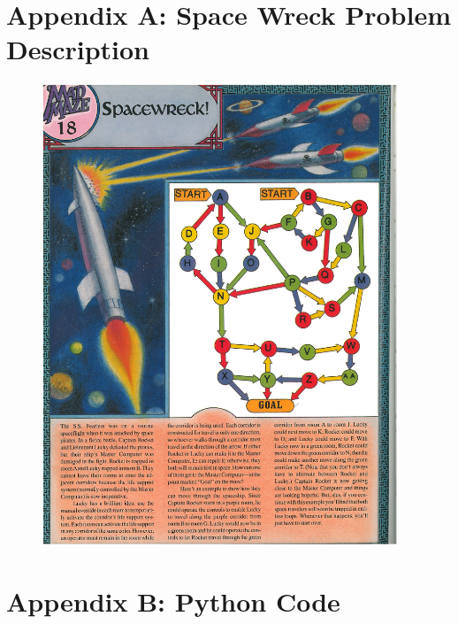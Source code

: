 \documentclass[12pt]{exam}
\begin{document}
\section{Appendix A: Space Wreck Problem Description}
\begin{figure}[H]
    \centering
    \includegraphics[width=0.95\textwidth]{../18SpaceWreck.pdf}
\end{figure}

\pagebreak
\section*{Appendix B: Python Code}

\end{document}
